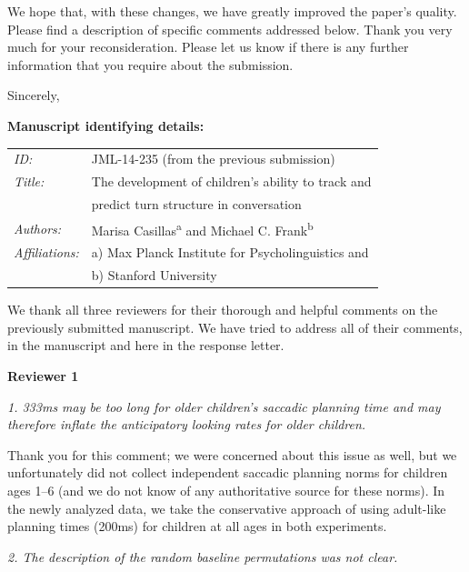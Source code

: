 \documentclass[11pt,a4paper]{letter} %
\begin{document}
\begin{letter}{}
\noindent We hope that, with these changes, we have greatly improved the paper's quality. Please find a description of specific comments addressed below. Thank you very much for your reconsideration. Please let us know if there is any further information that you require about the submission.

\closing{Sincerely,}

\bigskip 
\bigskip 

\textbf{Manuscript identifying details:}

\begin{tabular}{ll}
\textit{ID:} & JML-14-235 (from the previous submission) \\
\textit{Title:} & The development of children's ability to track and \\
& predict turn structure in conversation \\
\textit{Authors:} & Marisa Casillas\textsuperscript{a} and Michael C. Frank\textsuperscript{b} \\
\textit{Affiliations:} & a) Max Planck Institute for Psycholinguistics and \\
& b) Stanford University
\end{tabular}

\newpage

\noindent We thank all three reviewers for their thorough and helpful comments on the previously submitted manuscript. We have tried to address all of their comments, in the manuscript and here in the response letter.

\medskip

\noindent \textbf{Reviewer 1}

\noindent \textit{1. 333ms may be too long for older children's saccadic planning time and may therefore inflate the anticipatory looking rates for older children.}

\noindent Thank you for this comment; we were concerned about this issue as well, but we unfortunately did not collect independent saccadic planning norms for children ages 1--6 (and we do not know of any authoritative source for these norms). In the newly analyzed data, we take the conservative approach of using adult-like planning times (200ms) for children at all ages in both experiments.

\smallskip

\noindent \textit{2. The description of the random baseline permutations was not clear.}


\end{letter}
\end{document}
